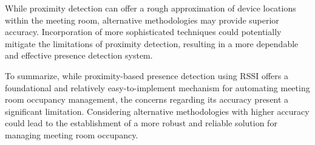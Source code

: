 While proximity detection can offer a rough approximation of device locations within the meeting room, alternative methodologies may provide superior accuracy. Incorporation of more sophisticated techniques could potentially mitigate the limitations of proximity detection, resulting in a more dependable and effective presence detection system.

To summarize, while proximity-based presence detection using RSSI offers a foundational and relatively easy-to-implement mechanism for automating meeting room occupancy management, the concerns regarding its accuracy present a significant limitation. Considering alternative methodologies with higher accuracy could lead to the establishment of a more robust and reliable solution for managing meeting room occupancy.
